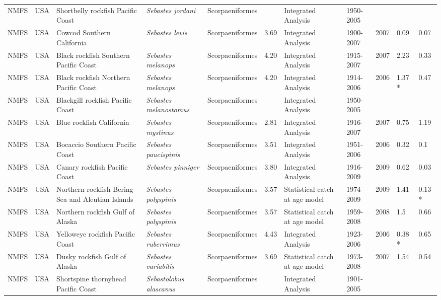 \begin{longtable}{p{1.5cm}p{1.5cm}p{3cm}p{3cm}p{2.5cm}p{0.9cm}p{1.4cm}p{0.9cm}p{0.9cm}p{0.9cm}p{1cm}}
  NMFS & USA & Shortbelly rockfish Pacific Coast & \textit{Sebastes jordani} & Scorpaeniformes &  & Integrated Analysis & 1950-2005 &  &  &  \\ 
  NMFS & USA & Cowcod Southern California & \textit{Sebastes levis} & Scorpaeniformes & 3.69 & Integrated Analysis & 1900-2007 & 2007 & 0.09 & 0.07 \\ 
  NMFS & USA & Black rockfish Southern Pacific Coast & \textit{Sebastes melanops} & Scorpaeniformes & 4.20 & Integrated Analysis & 1915-2007 & 2007 & 2.23 & 0.33 \\ 
  NMFS & USA & Black rockfish Northern Pacific Coast & \textit{Sebastes melanops} & Scorpaeniformes & 4.20 & Integrated Analysis & 1914-2006 & 2006 & 1.37 * & 0.47 \\ 
  NMFS & USA & Blackgill rockfish  Pacific Coast & \textit{Sebastes melanostomus} & Scorpaeniformes &  & Integrated Analysis & 1950-2005 &  &  &  \\ 
  NMFS & USA & Blue rockfish California & \textit{Sebastes mystinus} & Scorpaeniformes & 2.81 & Integrated Analysis & 1916-2007 & 2007 & 0.75 & 1.19 \\ 
  NMFS & USA & Bocaccio Southern Pacific Coast & \textit{Sebastes paucispinis} & Scorpaeniformes & 3.51 & Integrated Analysis & 1951-2006 & 2006 & 0.32 & 0.1 \\ 
  NMFS & USA & Canary rockfish Pacific Coast & \textit{Sebastes pinniger} & Scorpaeniformes & 3.80 & Integrated Analysis & 1916-2009 & 2009 & 0.62 & 0.03 \\ 
  NMFS & USA & Northern rockfish Bering Sea and Aleutian Islands & \textit{Sebastes polyspinis} & Scorpaeniformes & 3.57 & Statistical catch at age model & 1974-2009 & 2009 & 1.41 & 0.13 * \\ 
  NMFS & USA & Northern rockfish Gulf of Alaska & \textit{Sebastes polyspinis} & Scorpaeniformes & 3.57 & Statistical catch at age model & 1959-2008 & 2008 & 1.5 & 0.66 \\ 
  NMFS & USA & Yelloweye rockfish Pacific Coast & \textit{Sebastes ruberrimus} & Scorpaeniformes & 4.43 & Integrated Analysis & 1923-2006 & 2006 & 0.38 * & 0.65 \\ 
  NMFS & USA & Dusky rockfish Gulf of Alaska & \textit{Sebastes variabilis} & Scorpaeniformes & 3.69 & Statistical catch at age model & 1973-2008 & 2007 & 1.54 & 0.54 \\ 
  NMFS & USA & Shortspine thornyhead Pacific Coast & \textit{Sebastolobus alascanus} & Scorpaeniformes &  & Integrated Analysis & 1901-2005 &  &  &  \\ 

\end{longtable}
